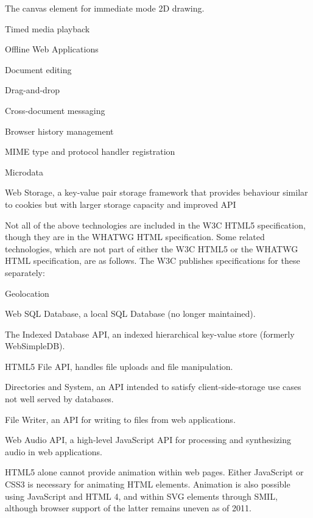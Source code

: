 \begin{compactitem}
\item The canvas element for immediate mode 2D drawing. 
\item Timed media playback
\item Offline Web Applications
\item Document editing
\item Drag-and-drop
\item Cross-document messaging
\item Browser history management
\item MIME type and protocol handler registration
\item Microdata
\item Web Storage, a key-value pair storage framework that provides behaviour similar to cookies but with larger storage capacity and improved API
\end{compactitem}


Not all of the above technologies are included in the W3C HTML5 specification, though they are in the WHATWG HTML specification. Some related technologies, which are not part of either the W3C HTML5 or the WHATWG HTML specification, are as follows. The W3C publishes specifications for these separately:

\begin{compactitem}
\item Geolocation
\item Web SQL Database, a local SQL Database (no longer maintained).
\item The Indexed Database API, an indexed hierarchical key-value store (formerly WebSimpleDB).
\item HTML5 File API, handles file uploads and file manipulation.
\item Directories and System, an API intended to satisfy client-side-storage use cases not well served by databases.
\item File Writer, an API for writing to files from web applications.
\item Web Audio API, a high-level JavaScript API for processing and synthesizing audio in web applications.
\end{compactitem}

HTML5 alone cannot provide animation within web pages. Either JavaScript or CSS3 is necessary for animating HTML elements. Animation is also possible using JavaScript and HTML 4, and within SVG elements through SMIL, although browser support of the latter remains uneven as of 2011.

